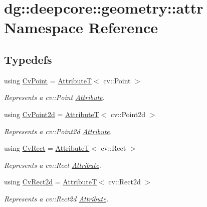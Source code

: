 \hypertarget{namespacedg_1_1deepcore_1_1geometry_1_1attr}{}\section{dg\+:\+:deepcore\+:\+:geometry\+:\+:attr Namespace Reference}
\label{namespacedg_1_1deepcore_1_1geometry_1_1attr}
\subsection*{Typedefs}
\begin{DoxyCompactItemize}
\item 
using \hyperlink{group___geometry_attributes_ga01f1670ca2631504526d8a31da2c2dab}{Cv\+Point} = \hyperlink{structdg_1_1deepcore_1_1_attribute_t}{AttributeT}$<$ cv\+::\+Point $>$
\begin{DoxyCompactList}\small\item\em Represents a {\ttfamily cv\+::\+Point} \hyperlink{classdg_1_1deepcore_1_1_attribute}{Attribute}. \end{DoxyCompactList}\item 
using \hyperlink{group___geometry_attributes_ga5bf440b90d7f88552975a2ef0a793b29}{Cv\+Point2d} = \hyperlink{structdg_1_1deepcore_1_1_attribute_t}{AttributeT}$<$ cv\+::\+Point2d $>$
\begin{DoxyCompactList}\small\item\em Represents a {\ttfamily cv\+::\+Point2d} \hyperlink{classdg_1_1deepcore_1_1_attribute}{Attribute}. \end{DoxyCompactList}\item 
using \hyperlink{group___geometry_attributes_gaf468cd05b887ecf25a5cc5987699b696}{Cv\+Rect} = \hyperlink{structdg_1_1deepcore_1_1_attribute_t}{AttributeT}$<$ cv\+::\+Rect $>$
\begin{DoxyCompactList}\small\item\em Represents a {\ttfamily cv\+::\+Rect} \hyperlink{classdg_1_1deepcore_1_1_attribute}{Attribute}. \end{DoxyCompactList}\item 
using \hyperlink{group___geometry_attributes_ga27ad4b2d4055276ed4b3c849d0d8752f}{Cv\+Rect2d} = \hyperlink{structdg_1_1deepcore_1_1_attribute_t}{AttributeT}$<$ cv\+::\+Rect2d $>$
\begin{DoxyCompactList}\small\item\em Represents a {\ttfamily cv\+::\+Rect2d} \hyperlink{classdg_1_1deepcore_1_1_attribute}{Attribute}. \end{DoxyCompactList}\item 

\end{DoxyCompactItemize}
